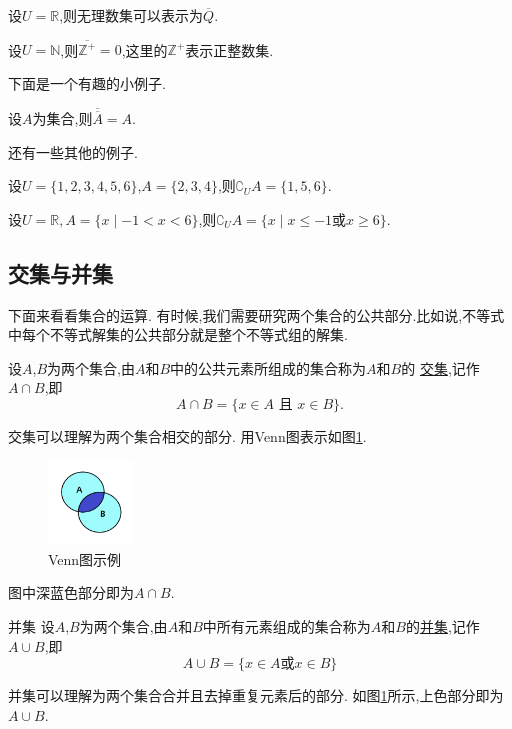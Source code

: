 \documentclass[lang=cn,math=cm,chinesefont=nofont,11pt,scheme=chinese,twocol]{elegantbook}
\begin{document}
\begin{example}
  设$U=\mathbb{R}$,则无理数集可以表示为$\overline{Q}$.
\end{example}

\begin{example}
  设$U=\mathbb{N}$,则$\overline{\mathbb{Z}^+}={0}$,这里的$\mathbb{Z}^+$表示正整数集.
\end{example}

下面是一个有趣的小例子.

\begin{example}
  设$A$为集合,则$\overline{\overline{A}}=A$.
\end{example}

还有一些其他的例子.

\begin{example}
  设$U=\{1,2,3,4,5,6\}$,$A=\{2,3,4\}$,则$\complement_{U}A=\{1,5,6\}.$
\end{example}

\begin{example}
  设$U=\mathbb{R},A=\{x\mid -1<x<6\}$,则$\complement_{U}A=\{x\mid x\leq -1\text{或}x\geq 6\}.$
\end{example}

\subsection{交集与并集}
下面来看看集合的运算.
有时候,我们需要研究两个集合的公共部分.比如说,不等式中每个不等式解集的公共部分就是整个不等式组的解集.
\begin{definition}[交集]
  设$A$,$B$为两个集合,由$A$和$B$中的公共元素所组成的集合称为$A$和$B$的
  \underline{交集},记作$A\cap B$,即$$A\cap B=\{x\in A\text{ 且 }x\in B\}.$$
\end{definition}
  交集可以理解为两个集合相交的部分.
  用Venn图表示如图\ref{img:Venn2}.
  \begin{figure}[h]
    \centering
    \includegraphics[width=0.2\textwidth]{image/Venn2.png}
    \caption{Venn图示例}
    \label{img:Venn2}
  \end{figure}
  图中深蓝色部分即为$A\cap B$.

\begin{definition}{并集}
  设$A$,$B$为两个集合,由$A$和$B$中所有元素组成的集合称为$A$和$B$的\underline{并集},记作$A\cup B$,即
  $$A\cup B=\{x\in A\text{或}x\in B\}$$
\end{definition}
  并集可以理解为两个集合合并且去掉重复元素后的部分.
  如图\ref{img:Venn2}所示,上色部分即为$A\cup B$. 
\end{document}

